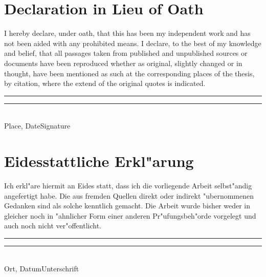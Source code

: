 {\section*{\centering Declaration in Lieu of Oath}
\glqq I hereby declare, under oath, that this \MakeLowercase{\thesis} has been my independent work and has not been aided with any prohibited means. I declare, to the best of my knowledge and belief, that all passages taken from published and unpublished sources or documents have been reproduced whether as original, slightly changed or in thought, have been mentioned as such at the corresponding places of the thesis, by citation, where the extend of the original quotes is indicated.\grqq\\[5\baselineskip]
\rule{5cm}{0.2pt}\hfill\rule{5cm}{0.2pt}\\
\phantom{Date }Place, Date\hfill Signature\hspace{15mm}}
{\section*{\centering Eidesstattliche Erkl"arung}
\glqq Ich erkl"are hiermit an Eides statt, dass ich die vorliegende Arbeit selbst"andig angefertigt habe. Die aus fremden Quellen direkt oder indirekt "ubernommenen Gedanken sind als solche kenntlich gemacht. Die Arbeit wurde bisher weder in gleicher noch in "ahnlicher Form einer anderen Pr"ufungsbeh"orde vorgelegt und auch noch nicht ver"offentlicht.\grqq\\[5\baselineskip]
\rule{5cm}{0.2pt}\hfill\rule{5cm}{0.2pt}\\
\phantom{Datum }Ort, Datum\hfill Unterschrift\hspace{15mm}}
\newpage
